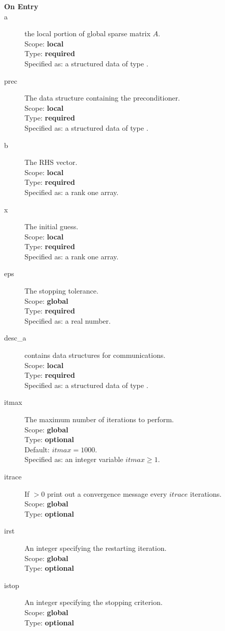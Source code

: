 \begin{description}
\item[\bf On Entry]
\item[a] the local portion of global sparse matrix
$A$. \\
Scope: {\bf local} \\
Type: {\bf required}\\
Specified as: a structured data of type \spdata.
\item[prec] The data structure containing the preconditioner.\\
Scope: {\bf local} \\
Type: {\bf required}\\
Specified as: a structured data of type \precdata.
\item[b] The RHS vector. \\
Scope: {\bf local} \\
Type: {\bf required}\\
Specified as: a rank one array.
\item[x] The initial guess. \\
Scope: {\bf local} \\
Type: {\bf required}\\
Specified as: a rank one array.
\item[eps] The stopping tolerance. \\
Scope: {\bf global} \\
Type: {\bf required}\\
Specified as: a real number. 
\item[desc\_a] contains data structures for communications.\\
Scope: {\bf local} \\
Type: {\bf required}\\
Specified as: a structured data of type \descdata.
\item[itmax]  The maximum number of iterations to perform.\\
Scope: {\bf global} \\
Type: {\bf optional}\\
Default: $itmax = 1000$.\\
Specified as: an integer variable $itmax \ge 1$.
\item[itrace]  If $>0$  print out a convergence message every $itrace$ iterations.\\
Scope: {\bf global} \\
Type: {\bf optional}\\
\item[irst]  An integer specifying the restarting iteration.\\
Scope: {\bf global} \\
Type: {\bf optional}\\
\item[istop]  An integer specifying the stopping criterion.\\
Scope: {\bf global} \\
Type: {\bf optional}\\


\end{description}
